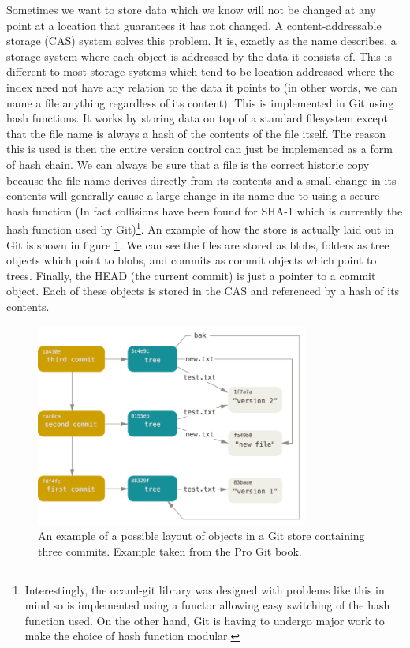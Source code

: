 Sometimes we want to store data which we know will not be changed at any point at a location that guarantees it has not changed. A content-addressable storage (CAS) system solves this problem. It is, exactly as the name describes, a storage system where each object is addressed by the data it consists of. This is different to most storage systems which tend to be location-addressed where the index need not have any relation to the data it points to (in other words, we can name a file anything regardless of its content). This is implemented in Git using hash functions. It works by storing data on top of a standard filesystem except that the file name is always a hash of the contents of the file itself. The reason this is used is then the entire version control can just be implemented as a form of hash chain. We can always be sure that a file is the correct historic copy because the file name derives directly from its contents and a small change in its contents will generally cause a large change in its name due to using a secure hash function (In fact collisions have been found for SHA-1 which is currently the hash function used by Git)\footnote{Interestingly, the ocaml-git library was designed with problems like this in mind so is implemented using a functor allowing easy switching of the hash function used. On the other hand, Git is having to undergo major work to make the choice of hash function modular\cite{git_transition}.}. An example of how the store is actually laid out in Git is shown in figure \ref{fig:gitdatamodel}. We can see the files are stored as blobs, folders as tree objects which point to blobs, and commits as commit objects which point to trees. Finally, the HEAD (the current commit) is just a pointer to a commit object. Each of these objects is stored in the CAS and referenced by a hash of its contents.

\begin{figure}[h]
  \center
  \includegraphics[width=0.8\textwidth]{figs/git-data-model}
  \caption{An example of a possible layout of objects in a Git store containing three commits. Example taken from the Pro Git book\cite{chacon2014git}.}
  \label{fig:gitdatamodel}
\end{figure}

